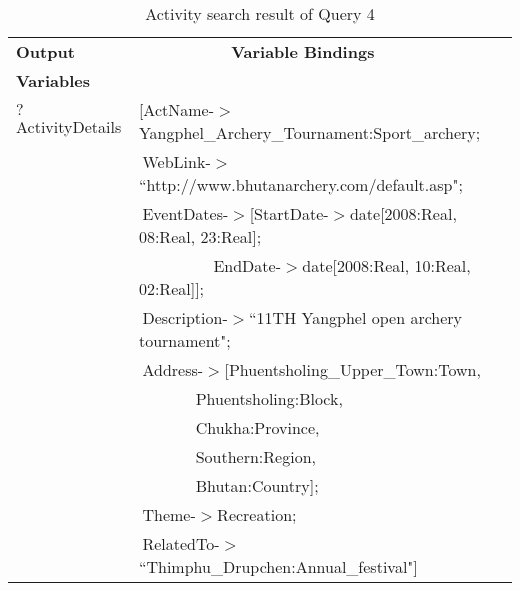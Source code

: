 \begin{table} [tbph]
\caption{Activity search result of Query 4}
\centering
\footnotesize
\begin{tabular}{|l|l|}
\hline
 \textbf{Output} &$~~~~~~~~~~~~~~~~~~~~~~~~~~$\textbf{Variable Bindings} \\
 \textbf{Variables}&                \\
\hline
 $?$ActivityDetails&[ActName-$>$Yangphel\_Archery\_Tournament:Sport\_archery;\\
           &$~$WebLink-$>$``http://www.bhutanarchery.com/default.asp"; \\
		   &$~$EventDates-$>$[StartDate-$>$date[2008:Real, 08:Real, 23:Real];\\
           &$~~~~~~~~~~~~~~~~~~~~~$EndDate-$>$date[2008:Real, 10:Real, 02:Real]];\\	   
          &$~$Description-$>$``11TH Yangphel open archery tournament";\\
          &$~$Address-$>$[Phuentsholing\_Upper\_Town:Town, \\
		&$~~~~~~~~~~~~~~~~$Phuentsholing:Block, \\
		&$~~~~~~~~~~~~~~~~$Chukha:Province, \\
		&$~~~~~~~~~~~~~~~~$Southern:Region,\\
        &$~~~~~~~~~~~~~~~~$Bhutan:Country];\\
		&$~$Theme-$>$Recreation;\\
        &$~$RelatedTo-$>$``Thimphu\_Drupchen:Annual\_festival"] \\
 \hline
\end{tabular} 
\end{table}

